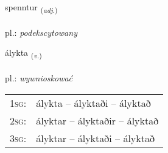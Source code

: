 \documentclass[frontgrid, backgrid]{flacards}\usepackage[]{graphicx}\usepackage[]{xcolor}
\begin{document}
\renewcommand{\flhead}{\vskip5pt \fboxsep=0pt {\small\bfseries\footnotesize Lýsingarorð | przymiotnik}}
\renewcommand{\fcfoot}{\vskip5pt \fboxsep=0pt \hspace{2pt}{\small\bfseries\footnotesize 3K}}

\renewcommand{\blhead}{\vskip5pt {\small\bfseries\footnotesize Lýsingarorð | przymiotnik }}
\renewcommand{\bcfoot}{\vskip5pt \hspace{2pt}{\small\bfseries\footnotesize 3K}}


{spenntur \small{\textsubscript{(\textit{adj.})}} \\[1ex] %
 \\
pl.: \emph{podekscytowany} \\  [2ex]
\renewcommand*{\arraystretch}{0.8}
}

\renewcommand{\flhead}{\vskip5pt \fboxsep=0pt {\small\bfseries\footnotesize Sagnorð | czasownik}}
\renewcommand{\fcfoot}{\vskip5pt \fboxsep=0pt \hspace{2pt}{\small\bfseries\footnotesize 3K}}

\renewcommand{\blhead}{\vskip5pt {\small\bfseries\footnotesize Sagnorð | czasownik }}
\renewcommand{\bcfoot}{\vskip5pt \hspace{2pt}{\small\bfseries\footnotesize 3K}}


{álykta \small{\textsubscript{(\textit{v.})}} \\[1ex] %
\textphonetic{[auːlɪxta]} \\
pl.: \emph{wywnioskować} \\  [2ex]
\renewcommand*{\arraystretch}{0.8}
\begin{tabular}{p{1cm}l}
\textsc{1sg}: & álykta -- ályktaði -- ályktað \\ 
\textsc{2sg}: & ályktar -- ályktaðir -- ályktað \\ 
\textsc{3sg}: & ályktar -- ályktaði -- ályktað \\ 
\end{tabular}
}
\end{document}
